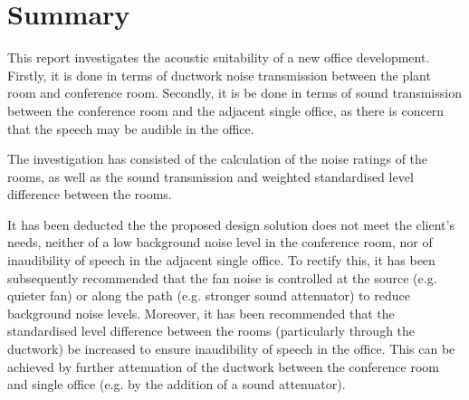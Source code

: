 
\section{Summary}

This report investigates the acoustic suitability of a new office development.
Firstly, it is done in terms of ductwork noise transmission between the plant room and conference room.
Secondly, it is be done in terms of sound transmission between the conference room and the adjacent single office, as there is concern that the speech may be audible in the office.

The investigation has consisted of the calculation of the noise ratings of the rooms, as well as the sound transmission and weighted standardised level difference between the rooms.

It has been deducted the the proposed design solution does not meet the client's needs, neither of a low background noise level in the conference room, nor of inaudibility of speech in the adjacent single office.
To rectify this, it has been subsequently recommended that the fan noise is controlled at the source (e.g. quieter fan) or along the path (e.g. stronger sound attenuator) to reduce background noise levels.
Moreover, it has been recommended that the standardised level difference between the rooms (particularly through the ductwork) be increased to ensure inaudibility of speech in the office.
This can be achieved by further attenuation of the ductwork between the conference room and single office (e.g. by the addition of a sound attenuator).